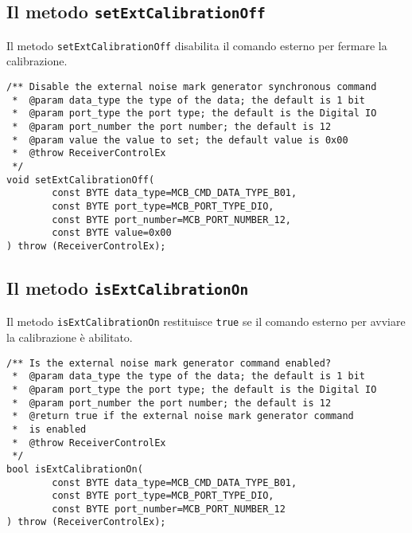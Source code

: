 \subsection{Il metodo \texttt{setExtCalibrationOff}}
Il metodo \texttt{setExtCalibrationOff} disabilita il comando esterno per fermare la calibrazione.
\lstset{language=C++}
\begin{lstlisting}[caption={Dichiarazione del metodo \texttt{setExtCalibrationOff}},
label=lst:setExtCalibrationOff,mathescape]
/** Disable the external noise mark generator synchronous command
 *  @param data_type the type of the data; the default is 1 bit
 *  @param port_type the port type; the default is the Digital IO
 *  @param port_number the port number; the default is 12
 *  @param value the value to set; the default value is 0x00
 *  @throw ReceiverControlEx
 */
void setExtCalibrationOff(
        const BYTE data_type=MCB_CMD_DATA_TYPE_B01, 
        const BYTE port_type=MCB_PORT_TYPE_DIO, 
        const BYTE port_number=MCB_PORT_NUMBER_12, 
        const BYTE value=0x00
) throw (ReceiverControlEx);
\end{lstlisting}
\lstset{numbers=none}


\subsection{Il metodo \texttt{isExtCalibrationOn}}
Il metodo \texttt{isExtCalibrationOn} restituisce \texttt{true} se il comando esterno 
per avviare la calibrazione \`e abilitato.
\lstset{language=C++}
\begin{lstlisting}[caption={Dichiarazione del metodo \texttt{isExtCalibrationOn}},
label=lst:isExtCalibrationOn,mathescape]
/** Is the external noise mark generator command enabled?
 *  @param data_type the type of the data; the default is 1 bit
 *  @param port_type the port type; the default is the Digital IO
 *  @param port_number the port number; the default is 12
 *  @return true if the external noise mark generator command 
 *  is enabled
 *  @throw ReceiverControlEx
 */
bool isExtCalibrationOn(
        const BYTE data_type=MCB_CMD_DATA_TYPE_B01, 
        const BYTE port_type=MCB_PORT_TYPE_DIO, 
        const BYTE port_number=MCB_PORT_NUMBER_12
) throw (ReceiverControlEx);
\end{lstlisting}
\lstset{numbers=none}


